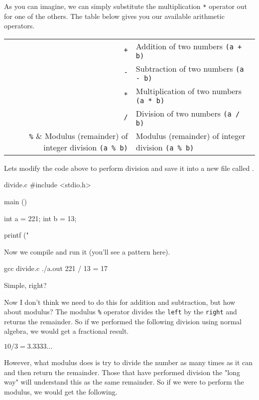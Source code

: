 As you can imagine, we can simply substitute the multiplication \verb|*|
operator out for one of the others. The table below gives you our available
arithmetic operators.

\begin{center}
\begin{tabular}{r l}
\hline
\verb|+| & Addition of two numbers \verb|(a + b)| \\
\verb|-| & Subtraction of two numbers \verb|(a - b)| \\
\verb|*| & Multiplication of two numbers \verb|(a * b)| \\
\verb|/| & Division of two numbers \verb|(a / b)| \\
\verb|%| & Modulus (remainder) of integer division \verb|(a % b)| \\
\hline
\end{tabular}
\end{center}

Lets modify the code above to perform division and save it into a new file
called .

\begin{code}{divide.c}
#include <stdio.h>

main ()
{
    int a = 221;
    int b = 13;

    printf ("%
}
\end{code}

Now we compile  and run it (you'll see a pattern here).

\begin{Terminal}
gcc divide.c
./a.out
221 / 13 = 17
\end{Terminal}

Simple, right?

Now I don't think we need to do this for addition and subtraction, but how about
modulus? The modulus \verb|%| operator divides the \verb|left| by the
\verb|right| and returns the remainder. So if we performed the following
division using normal algebra, we would get a fractional result.

\begin{center}
\begin{math}
10 / 3 = 3.3333...
\end{math}
\end{center}

However, what modulus does is try to divide the number as many times as it can
and then return the remainder. Those that have performed division the "long way"
will understand this as the same remainder. So if we were to perform the
modulus, we would get the following.

